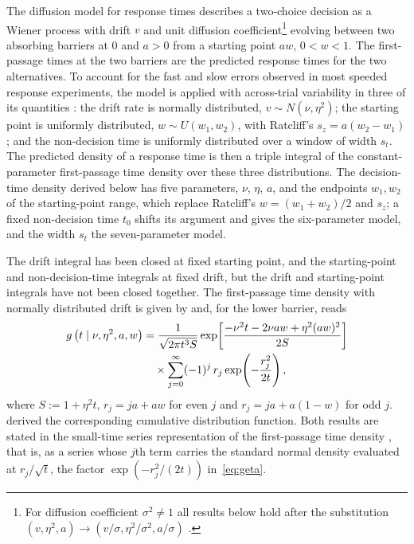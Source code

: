 \documentclass[final,5p,times,twocolumn,authoryear]{elsarticle}
\begin{document}
The diffusion model for response times \citep{Ratcliff1978} describes a two-choice decision as a Wiener process with drift $v$ and unit diffusion coefficient\footnote{For diffusion coefficient $\sigma^2 \neq 1$ all results below hold after the substitution $(v, \eta^2, a) \to (v/\sigma, \eta^2/\sigma^2, a/\sigma)$ \citep{Blurton2017}.} evolving between two absorbing barriers at $0$ and $a > 0$ from a starting point $aw$, $0 < w < 1$. The first-passage times at the two barriers are the predicted response times for the two alternatives. To account for the fast and slow errors observed in most speeded response experiments, the model is applied with across-trial variability in three of its quantities \citep{Ratcliff1978, RatcliffRouder1998, RatcliffTuerlinckx2002, RatcliffMcKoon2008}: the drift rate is normally distributed, $v \sim N(\nu, \eta^2)$; the starting point is uniformly distributed, $w \sim U(w_1, w_2)$, with Ratcliff's $s_z = a(w_2 - w_1)$; and the non-decision time is uniformly distributed over a window of width $s_t$. The predicted density of a response time is then a triple integral of the constant-parameter first-passage time density over these three distributions. The decision-time density derived below has five parameters, $\nu$, $\eta$, $a$, and the endpoints $w_1, w_2$ of the starting-point range, which replace Ratcliff's $w = (w_1 + w_2)/2$ and $s_z$; a fixed non-decision time $t_0$ shifts its argument and gives the six-parameter model, and the width $s_t$ the seven-parameter model.

The drift integral has been closed at fixed starting point, and the starting-point and non-decision-time integrals at fixed drift, but the drift and starting-point integrals have not been closed together. The first-passage time density with normally distributed drift is given by \citet{HorrocksThompson2004} and, for the lower barrier, reads \citep[Eq.~1]{Blurton2017}
\begin{align}
g\left(t \mid \nu, \eta^2, a, w\right)
 &= \frac{1}{\sqrt{2\pi t^3 S}}
   \exp\!\left[\frac{-\nu^2 t - 2\nu a w + \eta^2 (a w)^2}{2S}\right] \notag\\
 &\quad\times \sum_{j=0}^{\infty} (-1)^j\, r_j \exp\!\left(-\frac{r_j^2}{2t}\right),
\label{eq:geta}
\end{align}
where $S := 1 + \eta^2 t$, $r_j = ja + aw$ for even $j$ and $r_j = ja + a(1-w)$ for odd $j$. \citet{Blurton2017} derived the corresponding cumulative distribution function. Both results are stated in the small-time series representation of the first-passage time density \citep{Hall1997, VanZandt2000, NavarroFuss2009, Blurton2012, Gondan2014}, that is, as a series whose $j$th term carries the standard normal density evaluated at $r_j/\sqrt t$, the factor $\exp(-r_j^2/(2t))$ in~\eqref{eq:geta}.
\end{document}
